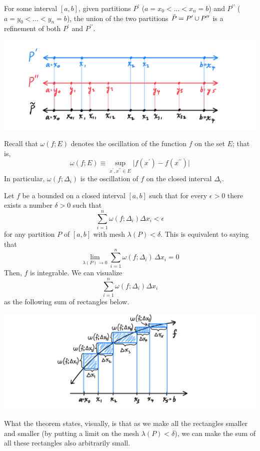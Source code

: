     \begin{example}
    For some interval $[a, b]$, given partitions $P^\prime$ ($a = x_0 < \ldots < x_n = b$) and $P^{\prime\prime}$ ($a = y_0 < \ldots < y_n = b$), the union of the two partitions $\Tilde{P} = P^\prime \cup P^{\prime\prime}$ is a refinement of both $P^\prime$ and $P^{\prime\prime}$. 
    \begin{center}
        \includegraphics[scale=0.25]{img/Refinement_as_Union_of_Partitions.PNG}
    \end{center}
    \end{example}
    
    Recall that $\omega(f; E)$ denotes the oscillation of the function $f$ on the set $E$; that is, 
    \[\omega(f; E) \equiv \sup_{x^\prime, x^{\prime\prime} \in E} \big| f(x^\prime) - f(x^{\prime\prime})\big|\]
    In particular, $\omega(f; \Delta_i)$ is the oscillation of $f$ on the closed interval $\Delta_i$. 

    \begin{theorem}
    Let $f$ be a bounded on a closed interval $[a, b]$ such that for every $\epsilon > 0$ there exists a number $\delta>0$ such that
    \[\sum_{i=1}^n \omega(f; \Delta_i) \Delta x_i < \epsilon\]
    for any partition $P$ of $[a, b]$ with mesh $\lambda(P) < \delta$. This is equivalent to saying that
    \[\lim_{\lambda(P) \rightarrow 0} \sum_{i = 1}^n \omega (f; \Delta_i) \, \Delta x_i = 0\]
    Then, $f$ is integrable. We can visualize
    \[\sum_{i=1}^n \omega(f; \Delta_i) \Delta x_i\]
    as the following sum of rectangles below. 
    \begin{center}
        \includegraphics[scale=0.25]{img/Sufficient_Condition_for_Integrability.PNG}
    \end{center}
    What the theorem states, visually, is that as we make all the rectangles smaller and smaller (by putting a limit on the mesh $\lambda(P)<\delta$), we can make the sum of all these rectangles also arbitrarily small. 
    \end{theorem}

